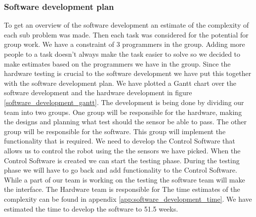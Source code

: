 \subsubsection{Software development plan}
To get an overview of the software development an estimate of the complexity of each sub problem was made.
Then each task was considered for the potential for group work.
We have a constraint of 3 programmers in the group.
Adding more people to a task doesn't always make the task easier to solve so we decided to make estimates based on the programmers we have in the group.
Since the hardware testing is crucial to the software development we have put this together with the software development plan. 
We have plotted a Gantt chart over the software development and the hardware development in figure \ref{software_development_gantt}.
The development is being done by dividing our team into two groups. 
One group will be responsible for the hardware, making the designs and planning what test should the sensor be able to pass.
The other group will be responsible for the software. 
This group will implement the functionality that is required.
We need to develop the Control Software that allows us to control the robot using the the sensors we have picked. 
When the Control Software is created we can start the testing phase. 
During the testing phase we will have to go back and add functionality to the Control Software. 
While a part of our team is working on the testing the software team will make the interface.
The Hardware team is responsible for 
The time estimates of the complexity can be found in appendix \ref{app:software_development_time}.
We have estimated the time to develop the software to 51.5 weeks.

